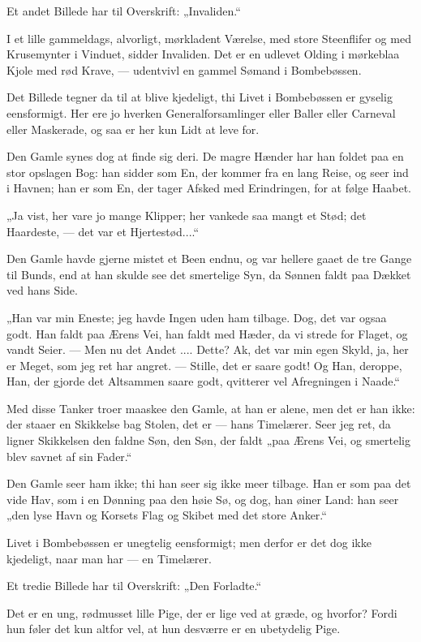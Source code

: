\documentclass[12pt,a4paper]{book}
\newcommand{\apage}[1]{\marginnote{\footnotesize\textit{[#1]}}}
\begin{document}
Et andet Billede har til Overskrift: „Invaliden.“

I et lille gammeldags, alvorligt, mørkladent Værelse, med store
Steenflifer og med Krusemynter i Vinduet, sidder Invaliden. Det er
en udlevet Olding i mørkeblaa Kjole med rød Krave, --- udentvivl en
gammel Sømand i Bombebøssen.
 \apage{85}

Det Billede tegner da til at blive kjedeligt, thi Livet i
Bombebøssen er gyselig eensformigt. Her ere jo hverken
Generalforsamlinger eller Baller eller Carneval eller Maskerade, og
saa er her kun Lidt at leve for.

Den Gamle synes dog at finde sig deri. De magre Hænder har han
foldet paa en stor opslagen Bog: han sidder som En, der kommer fra
en lang Reise, og seer ind i Havnen; han er som En, der tager
Afsked med Erindringen, for at følge Haabet.

„Ja vist, her vare jo mange Klipper; her vankede saa mangt et Stød;
det Haardeste, --- det var et Hjertestød....“

Den Gamle havde gjerne mistet et Been endnu, og var hellere gaaet
de tre Gange til Bunds, end at han skulde see det smertelige Syn,
da Sønnen faldt paa Dækket ved hans Side.

„Han var min Eneste; jeg havde Ingen uden ham tilbage. Dog, det var
ogsaa godt. Han faldt paa Ærens Vei, han faldt med Hæder, da vi
strede for Flaget, og vandt Seier. --- Men nu det Andet .... Dette?
Ak, det var min egen Skyld, ja, her er Meget, som jeg ret har
angret. --- Stille, det er saare godt! Og Han, deroppe, Han, der
gjorde det Altsammen saare godt, qvitterer vel Afregningen i
Naade.“

Med disse Tanker troer maaskee den Gamle, at han er alene, men det
er han ikke: der staaer en Skikkelse bag Stolen, det er --- hans
Timelærer. Seer jeg ret, da ligner Skikkelsen den faldne Søn, den
Søn, der faldt „paa Ærens Vei, og smertelig blev savnet af sin
Fader.“

Den Gamle seer ham ikke; thi han seer sig ikke meer tilbage. Han er
som paa det vide Hav, som i en Dønning paa den høie Sø, og dog, han
øiner Land: han seer „den lyse Havn og Korsets Flag og Skibet med
det store Anker.“

Livet i Bombebøssen er unegtelig eensformigt; men derfor er det dog
ikke kjedeligt, naar man har --- en Timelærer.

Et \apage{86} tredie Billede har til Overskrift: „Den Forladte.“

Det er en ung, rødmusset lille Pige, der er lige ved at græde, og
hvorfor? Fordi hun føler det kun altfor vel, at hun desværre er en
ubetydelig Pige.
\end{document}
